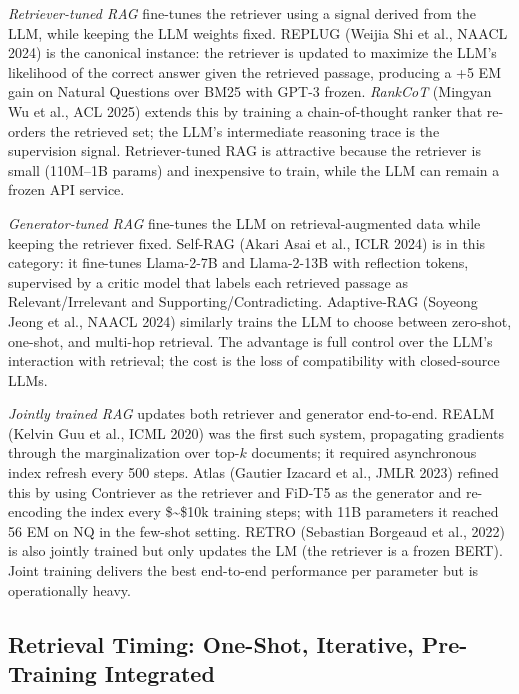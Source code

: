 \emph{Retriever-tuned RAG} fine-tunes the retriever using a signal derived from the LLM, while keeping the LLM weights fixed. REPLUG (Weijia Shi et al., NAACL 2024) is the canonical instance: the retriever is updated to maximize the LLM's likelihood of the correct answer given the retrieved passage, producing a +5 EM gain on Natural Questions over BM25 with GPT-3 frozen. \emph{RankCoT} (Mingyan Wu et al., ACL 2025) extends this by training a chain-of-thought ranker that re-orders the retrieved set; the LLM's intermediate reasoning trace is the supervision signal. Retriever-tuned RAG is attractive because the retriever is small (110M--1B params) and inexpensive to train, while the LLM can remain a frozen API service.

\emph{Generator-tuned RAG} fine-tunes the LLM on retrieval-augmented data while keeping the retriever fixed. Self-RAG (Akari Asai et al., ICLR 2024) is in this category: it fine-tunes Llama-2-7B and Llama-2-13B with reflection tokens, supervised by a critic model that labels each retrieved passage as Relevant/Irrelevant and Supporting/Contradicting. Adaptive-RAG (Soyeong Jeong et al., NAACL 2024) similarly trains the LLM to choose between zero-shot, one-shot, and multi-hop retrieval. The advantage is full control over the LLM's interaction with retrieval; the cost is the loss of compatibility with closed-source LLMs.

\emph{Jointly trained RAG} updates both retriever and generator end-to-end. REALM (Kelvin Guu et al., ICML 2020) was the first such system, propagating gradients through the marginalization over top-\(k\) documents; it required asynchronous index refresh every 500 steps. Atlas (Gautier Izacard et al., JMLR 2023) refined this by using Contriever as the retriever and FiD-T5 as the generator and re-encoding the index every \$\sim\$10k training steps; with 11B parameters it reached 56 EM on NQ in the few-shot setting. RETRO (Sebastian Borgeaud et al., 2022) is also jointly trained but only updates the LM (the retriever is a frozen BERT). Joint training delivers the best end-to-end performance per parameter but is operationally heavy.

\subsection{Retrieval Timing: One-Shot, Iterative, Pre-Training Integrated}\label{retrieval-timing-one-shot-iterative-pre-training-integrated}

